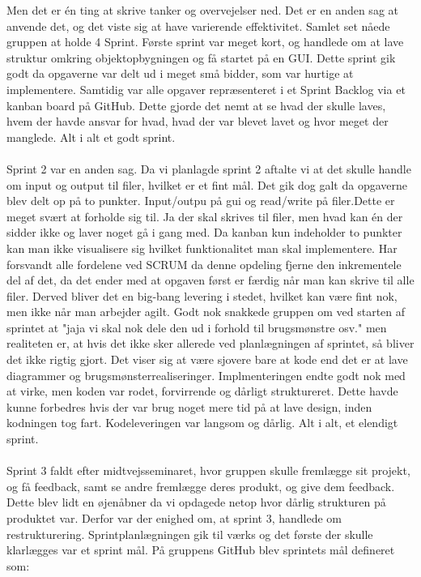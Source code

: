 Men det er én ting at skrive tanker og overvejelser ned. Det er en anden sag at anvende det, og det viste sig at have varierende effektivitet. Samlet set nåede gruppen at holde 4 Sprint. Første sprint var meget kort, og handlede om at lave struktur omkring objektopbygningen og få startet på en GUI. Dette sprint gik godt da opgaverne var delt ud i meget små bidder, som var hurtige at implementere. Samtidig var alle opgaver repræsenteret i et Sprint Backlog via et kanban board på GitHub. Dette gjorde det nemt at se hvad der skulle laves, hvem der havde ansvar for hvad, hvad der var blevet lavet og hvor meget der manglede. Alt i alt et godt sprint.\\\\
Sprint 2 var en anden sag. Da vi planlagde sprint 2 aftalte vi at det skulle handle om input og output til filer, hvilket er et fint mål. Det gik dog galt da opgaverne blev delt op på to punkter. Input/outpu på gui og read/write på filer.Dette er meget svært at forholde sig til. Ja der skal skrives til filer, men hvad kan én der sidder ikke og laver noget gå i gang med. Da kanban kun indeholder to punkter kan man ikke visualisere sig hvilket funktionalitet man skal implementere. Har forsvandt alle fordelene ved SCRUM da denne opdeling fjerne den inkrementele del af det, da det ender med at opgaven først er færdig når man kan skrive til alle filer. Derved bliver det en big-bang levering i stedet, hvilket kan være fint nok, men ikke når man arbejder agilt. Godt nok snakkede gruppen om ved starten af sprintet at "jaja vi skal nok dele den ud i forhold til brugsmønstre osv." men realiteten er, at hvis det ikke sker allerede ved planlægningen af sprintet, så bliver det ikke rigtig gjort. Det viser sig at være sjovere bare at kode end det er at lave diagrammer og brugsmønsterrealiseringer. Implmenteringen endte godt nok med at virke, men koden var rodet, forvirrende og dårligt struktureret. Dette havde kunne forbedres hvis der var brug noget mere tid på at lave design, inden kodningen tog fart. Kodeleveringen var langsom og dårlig. Alt i alt, et elendigt sprint.\\\\
Sprint 3 faldt efter midtvejsseminaret, hvor gruppen skulle fremlægge sit projekt, og få feedback, samt se andre fremlægge deres produkt, og give dem feedback. Dette blev lidt en øjenåbner da vi opdagede netop hvor dårlig strukturen på produktet var. Derfor var der enighed om, at sprint 3, handlede om restrukturering. Sprintplanlægningen gik til værks og det første der skulle klarlægges var et sprint mål. På gruppens GitHub blev sprintets mål defineret som: 
